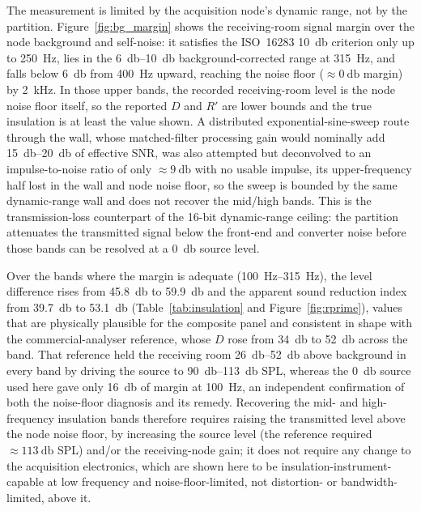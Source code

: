 The measurement is limited by the acquisition node's dynamic range, not by the partition. Figure~\ref{fig:bg_margin} shows the receiving-room signal margin over the node background and self-noise: it satisfies the ISO~16283 \SI{10}{\decibel} criterion only up to \SI{250}{\hertz}, lies in the \SIrange{6}{10}{\decibel} background-corrected range at \SI{315}{\hertz}, and falls below \SI{6}{\decibel} from \SI{400}{\hertz} upward, reaching the noise floor ($\approx\SI{0}{\decibel}$ margin) by \SI{2}{\kilo\hertz}. In those upper bands, the recorded receiving-room level is the node noise floor itself, so the reported $D$ and $R'$ are lower bounds and the true insulation is at least the value shown. A distributed exponential-sine-sweep route through the wall, whose matched-filter processing gain would nominally add \SIrange{15}{20}{\decibel} of effective SNR, was also attempted but deconvolved to an impulse-to-noise ratio of only $\approx\SI{9}{\decibel}$ with no usable impulse, its upper-frequency half lost in the wall and node noise floor, so the sweep is bounded by the same dynamic-range wall and does not recover the mid/high bands. This is the transmission-loss counterpart of the \mbox{16-bit} dynamic-range ceiling: the partition attenuates the transmitted signal below the front-end and converter noise before those bands can be resolved at a \SI{0}{\decibel} source level.

Over the bands where the margin is adequate (\SIrange{100}{315}{\hertz}), the level difference rises from \SI{45.8}{\decibel} to \SI{59.9}{\decibel} and the apparent sound reduction index from \SI{39.7}{\decibel} to \SI{53.1}{\decibel} (Table~\ref{tab:insulation} and Figure~\ref{fig:rprime}), values that are physically plausible for the composite panel and consistent in shape with the commercial-analyser reference, whose $D$ rose from \SI{34}{\decibel} to \SI{52}{\decibel} across the band. That reference held the receiving room \SIrange{26}{52}{\decibel} above background in every band by driving the source to \SIrange{90}{113}{\decibel} SPL, whereas the \SI{0}{\decibel} source used here gave only \SI{16}{\decibel} of margin at \SI{100}{\hertz}, an independent confirmation of both the noise-floor diagnosis and its remedy. Recovering the mid- and high-frequency insulation bands therefore requires raising the transmitted level above the node noise floor, by increasing the source level (the reference required $\approx\SI{113}{\decibel}$ SPL) and/or the receiving-node gain; it does not require any change to the acquisition electronics, which are shown here to be insulation-instrument-capable at low frequency and noise-floor-limited, not distortion- or bandwidth-limited, above it.

